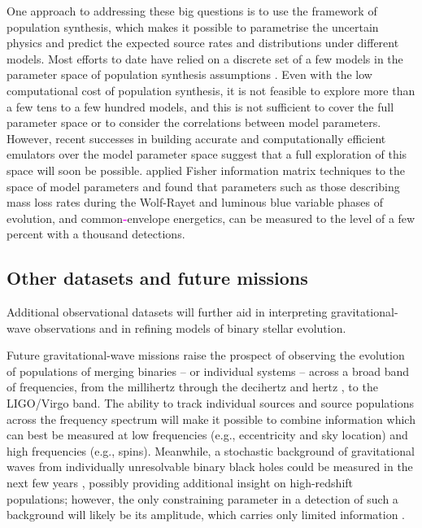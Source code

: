\documentclass[review]{elsarticle}
\newcommand{\ilya}[1]{\textcolor{magenta}{\bf{#1}}}
\begin{document}
One approach to addressing these big questions is to use the framework of population synthesis, which makes it possible to parametrise the uncertain physics and predict the expected source rates and distributions under different models.  Most efforts to date have relied on a discrete set of a few models in the parameter space of population synthesis assumptions \citep[e.g.,][]{Dominik:2012,Stevenson:2015}.  Even with the low computational cost of population synthesis, it is not feasible to explore more than a few tens to a few hundred models, and this is not sufficient to cover the full parameter space or to consider the correlations between model parameters.  However, recent successes in building accurate and computationally efficient emulators over the model parameter space \citep{Barrett:2017} suggest that a full exploration of this space will soon be possible. \citet{Barrett:2017FIM} applied Fisher information matrix techniques to the space of model parameters and found that parameters such as those describing mass loss rates during the Wolf-Rayet and luminous blue variable phases of evolution, and common\ilya{-}envelope energetics, can be measured to the level of a few percent with a thousand detections. 

\subsection{Other datasets and future missions}
Additional observational datasets will further aid in interpreting gravitational-wave observations and in refining models of binary stellar evolution.

Future gravitational-wave missions raise the prospect of observing the evolution of populations of merging binaries -- or individual systems -- across a broad band of frequencies, from the millihertz \citep[e.g.,][]{Sesana:2016} through the decihertz \citep{Mandel:2017} and hertz \citep{ET:2012}, to the LIGO/Virgo band.  The ability to track individual sources and source populations across the frequency spectrum will make it possible to combine information which can best be measured at low frequencies (e.g., eccentricity and sky location) and high frequencies (e.g., spins).  Meanwhile, a stochastic background of gravitational waves from individually unresolvable binary black holes could be measured in the next few years \citep{GW150914:stoch}, possibly providing additional insight on high-redshift populations; however, the only constraining parameter in a detection of such a background will likely be its amplitude, which carries only limited information \citep{Callister:2016}.
\end{document}
